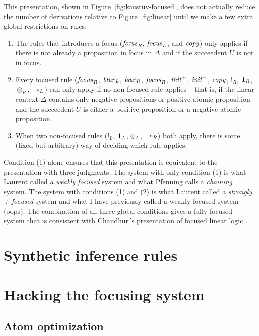 \newpage


  This presentation, shown in
Figure~\ref{fig:kaustuv-focused}, does not actually reduce the number
of derivations relative to Figure~\ref{fig:linear} until we make a few
extra global restrictions on rules:

\begin{enumerate}
\item The rules that introduces a focus (${\it focus}_R$, ${\it focus}_L$, 
  and ${\it copy}$) only applies if there is not already a proposition 
  in focus in $\Delta$ and if the succeedent $U$ is not in focus. 
\item Every focused rule (${\it focus}_R$, ${\it blur}_L$, ${\it
    blur}_R$, ${\it focus}_R$, ${\it init}^+$, ${\it init}^-$, ${\it
    copy}$, ${!}_R$, ${\mathbf{1}}_R$, ${\otimes}_R$, ${\multimap}_L$) can only
  apply if no non-focused rule applies -- that is, if the
  linear context $\Delta$ contains only negative propositions or positive
  atomic proposition and the succeedent $U$ is either a positive proposition
  or a negative atomic proposition.
\item When two non-focused rules (${!}_L$, ${\mathbf{1}}_L$, ${\otimes}_L$,
  ${\multimap}_R$) both apply, there is some (fixed but arbitrary) way of
  deciding which rule applies.
\end{enumerate}

\noindent
Condition (1) alone ensures that this presentation is equivalent to
the presentation with three judgments. The system with only condition
(1) is what Laurent called a {\it weakly focused} system
\cite{laurent04proof} and what Pfenning calls a {\it chaining} system.
The system with conditions (1) and (2) is what Laurent called a {\it
  strongly +-focused} system and what I have previously called a
weakly focused system (oops). The combination of all three global
conditions gives a fully focused system that is consistent with
Chaudhuri's presentation of focused linear logic
\cite{chaudhuri06focused}.


\section{Synthetic inference rules}


\section{Hacking the focusing system}

\subsection{Atom optimization}

